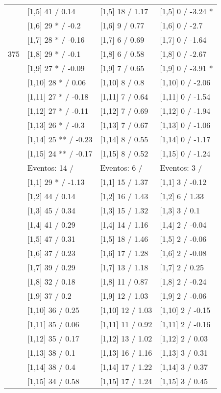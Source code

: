 \begin{table}
\begin{tabular}[t]{llll}
 & {}[1,5] 41  / 0.14 & {}[1,5] 18  / 1.17 & {}[1,5] 0  / -3.24 *\\
 & {}[1,6] 29 * / -0.2 & {}[1,6] 9  / 0.77 & {}[1,6] 0  / -2.7\\
 & {}[1,7] 28 * / -0.16 & {}[1,7] 6  / 0.69 & {}[1,7] 0  / -1.64\\
375 & {}[1,8] 29 * / -0.1 & {}[1,8] 6  / 0.58 & {}[1,8] 0  / -2.67\\
\addlinespace
 & {}[1,9] 27 * / -0.09 & {}[1,9] 7  / 0.65 & {}[1,9] 0  / -3.91 *\\
 & {}[1,10] 28 * / 0.06 & {}[1,10] 8  / 0.8 & {}[1,10] 0  / -2.06\\
 & {}[1,11] 27 * / -0.18 & {}[1,11] 7  / 0.64 & {}[1,11] 0  / -1.54\\
 & {}[1,12] 27 * / -0.11 & {}[1,12] 7  / 0.69 & {}[1,12] 0  / -1.94\\
 & {}[1,13] 26 * / -0.3 & {}[1,13] 7  / 0.67 & {}[1,13] 0  / -1.06\\
\addlinespace
 & {}[1,14] 25 ** / -0.23 & {}[1,14] 8  / 0.55 & {}[1,14] 0  / -1.17\\
 & {}[1,15] 24 ** / -0.17 & {}[1,15] 8  / 0.52 & {}[1,15] 0  / -1.24\\
 & Eventos:  14 / & Eventos:  6 / & Eventos:  3 /\\
 & {}[1,1] 29 * / -1.13 & {}[1,1] 15  / 1.37 & {}[1,1] 3  / -0.12\\
 & {}[1,2] 44  / 0.14 & {}[1,2] 16  / 1.43 & {}[1,2] 6  / 1.33\\
\addlinespace
 & {}[1,3] 45  / 0.34 & {}[1,3] 15  / 1.32 & {}[1,3] 3  / 0.1\\
 & {}[1,4] 41  / 0.29 & {}[1,4] 14  / 1.16 & {}[1,4] 2  / -0.04\\
 & {}[1,5] 47  / 0.31 & {}[1,5] 18  / 1.46 & {}[1,5] 2  / -0.06\\
 & {}[1,6] 37  / 0.23 & {}[1,6] 17  / 1.28 & {}[1,6] 2  / -0.08\\
 & {}[1,7] 39  / 0.29 & {}[1,7] 13  / 1.18 & {}[1,7] 2  / 0.25\\
\addlinespace
500 & {}[1,8] 32  / 0.18 & {}[1,8] 11  / 0.87 & {}[1,8] 2  / -0.24\\
 & {}[1,9] 37  / 0.2 & {}[1,9] 12  / 1.03 & {}[1,9] 2  / -0.06\\
 & {}[1,10] 36  / 0.25 & {}[1,10] 12  / 1.03 & {}[1,10] 2  / -0.15\\
 & {}[1,11] 35  / 0.06 & {}[1,11] 11  / 0.92 & {}[1,11] 2  / -0.16\\
 & {}[1,12] 35  / 0.17 & {}[1,12] 13  / 1.02 & {}[1,12] 2  / 0.03\\
\addlinespace
 & {}[1,13] 38  / 0.1 & {}[1,13] 16  / 1.16 & {}[1,13] 3  / 0.31\\
 & {}[1,14] 38  / 0.4 & {}[1,14] 17  / 1.22 & {}[1,14] 3  / 0.37\\
 & {}[1,15] 34  / 0.58 & {}[1,15] 17  / 1.24 & {}[1,15] 3  / 0.45\\
\bottomrule
\end{tabular}
\end{table}
